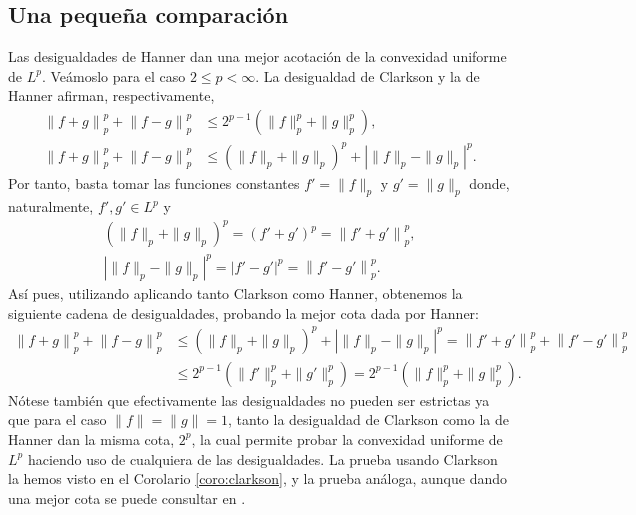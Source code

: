 \subsection{Una pequeña comparación}

Las desigualdades de Hanner dan una mejor acotación de la convexidad uniforme de $ L^p $. Veámoslo para el caso $ 2 \leq p < \infty $. La desigualdad de Clarkson y la de Hanner afirman, respectivamente, 
\begin{align}
    \left\| f+g \right\|_p^p + \left\| f-g \right\|_p^p &\leq 2^{p-1} \left( \|f\|_p^p + \|g\|_p^p \right), \\
    \left\| f+g \right\|_p^p + \left\| f-g \right\|_p^p &\leq \left( \|f \|_p + \|g\|_p \right)^p + \left| \|f \|_p - \|g\|_p \right|^p.
\end{align}
Por tanto, basta tomar las funciones constantes $ f' = \|f \|_p $ y $ g' = \|g\|_p $ donde, naturalmente, $ f', g' \in L^p $ y
\begin{align}
    \left( \|f \|_p + \|g\|_p \right)^p = \left( f' + g' \right)^p = \left\| f'+g' \right\|_p^p, \\
    \left| \|f \|_p - \|g\|_p \right|^p = \left| f' - g' \right|^p = \left\| f'-g' \right\|_p^p.
\end{align}
Así pues, utilizando aplicando tanto Clarkson como Hanner, obtenemos la siguiente cadena de desigualdades, probando la mejor cota dada por Hanner:
\begin{align}
     \left\| f+g \right\|_p^p + \left\| f-g \right\|_p^p &\leq  \left( \|f \|_p + \|g\|_p \right)^p + \left| \|f \|_p - \|g\|_p \right|^p = \left\| f'+g' \right\|_p^p + \left\| f'-g' \right\|_p^p \\
     &\leq 2^{p-1} \left( \|f'\|_p^p + \|g'\|_p^p \right) = 2^{p-1} \left( \|f\|_p^p + \|g\|_p^p \right).
\end{align}
Nótese también que efectivamente las desigualdades no pueden ser estrictas ya que para el caso $ \|f\| = \|g\| = 1 $, tanto la desigualdad de Clarkson como la de Hanner dan la misma cota, $ 2^p $, la cual permite probar la convexidad uniforme de $ L^p $ haciendo uso de cualquiera de las desigualdades. La prueba usando Clarkson la hemos visto en el Corolario \ref{coro:clarkson}, y la prueba análoga, aunque dando una mejor cota se puede consultar en \cite{hanner}.